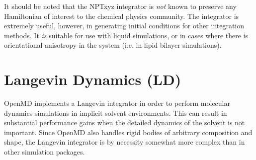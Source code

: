 \documentclass[]{book}
\begin{document}
It should be noted that the NPTxyz integrator is {\it not} known to
preserve any Hamiltonian of interest to the chemical physics
community.  The integrator is extremely useful, however, in generating
initial conditions for other integration methods.  It {\it is} suitable
for use with liquid simulations, or in cases where there is
orientational anisotropy in the system (i.e. in lipid bilayer
simulations).

\section{Langevin Dynamics (LD)\label{LDRB}}

{\sc OpenMD} implements a Langevin integrator in order to perform
molecular dynamics simulations in implicit solvent environments.  This
can result in substantial performance gains when the detailed dynamics
of the solvent is not important. Since {\sc OpenMD} also handles rigid
bodies of arbitrary composition and shape, the Langevin integrator is
by necessity somewhat more complex than in other simulation packages.
\end{document}
